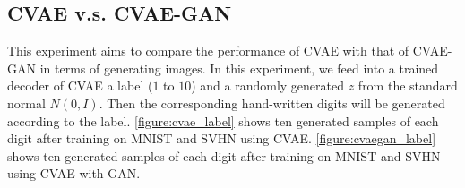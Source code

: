 \documentclass[10pt]{article}
\begin{document}
\subsection{CVAE v.s. CVAE-GAN} 

This experiment aims to compare the performance of CVAE with that of CVAE-GAN in terms of generating images. In this experiment, we feed into a trained decoder of CVAE a label ($1$ to $10$) and a randomly generated $z$ from the standard normal $N(0,I)$. Then the corresponding hand-written digits will be generated according to the label. \autoref{figure:cvae_label} shows ten generated samples of each digit after training on MNIST and SVHN using CVAE. \autoref{figure:cvaegan_label} shows ten generated samples of each digit after training on MNIST and SVHN using CVAE with GAN.
\end{document}
